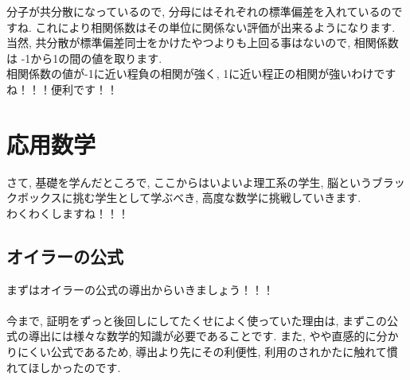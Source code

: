 \documentclass[11pt,a4paper]{jreport}
\begin{document}
分子が共分散になっているので, 分母にはそれぞれの標準偏差を入れているのですね. これにより相関係数はその単位に関係ない評価が出来るようになります. 当然, 共分散が標準偏差同士をかけたやつよりも上回る事はないので, 相関係数は -1から1の間の値を取ります.\\
相関係数の値が-1に近い程負の相関が強く, 1に近い程正の相関が強いわけですね！！！便利です！！\\











\chapter{応用数学}
さて, 基礎を学んだところで, ここからはいよいよ理工系の学生, 脳というブラックボックスに挑む学生として学ぶべき, 高度な数学に挑戦していきます.\\ 
わくわくしますね！！！\\
\section{オイラーの公式 \label{euler}}
まずはオイラーの公式の導出からいきましょう！！！\\
\\
今まで, 証明をずっと後回しにしてたくせによく使っていた理由は, まずこの公式の導出には様々な数学的知識が必要であることです. また, やや直感的に分かりにくい公式であるため, 導出より先にその利便性, 利用のされかたに触れて慣れてほしかったのです.\\
\end{document}
